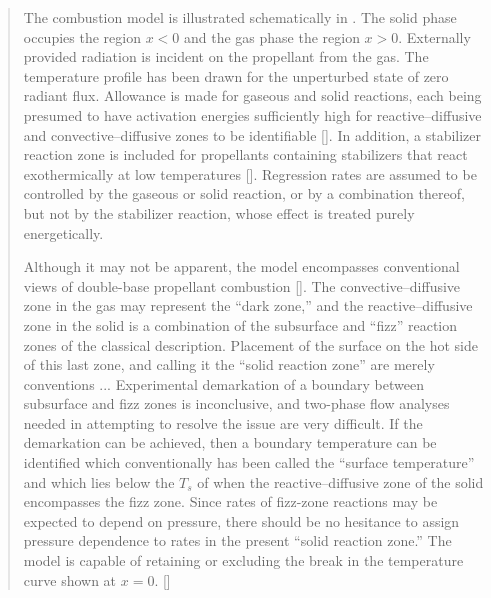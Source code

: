 \begin{quote}
The combustion model is illustrated schematically in . The solid phase occupies the region $x < 0$ and the gas phase the region $x > 0$. Externally provided radiation is incident on the propellant from the gas. The temperature profile has been drawn for the unperturbed state of zero radiant flux. Allowance is made for gaseous and solid reactions, each being presumed to have activation energies
sufficiently high for reactive--diffusive and convective--diffusive zones to be identifiable [\cite{Williams:1973}]. In addition, a stabilizer reaction zone is included for propellants containing stabilizers that react exothermically at low temperatures [\cite{Huggett:1960,Kovalskii:1967}]. Regression rates are assumed to be controlled by the gaseous or solid reaction, or by a combination thereof, but not by the stabilizer reaction, whose effect is treated purely energetically.

Although it may not be apparent, the model encompasses conventional views of double-base propellant combustion [\cite{Huggett:1960}]. The convective--diffusive zone in the gas may represent the ``dark zone,'' and the reactive--diffusive zone in the solid is a combination of the subsurface and ``fizz'' reaction zones of the classical description. Placement of the surface on the hot side of this last zone, and calling it the ``solid reaction zone'' are merely conventions ... Experimental demarkation of a boundary between subsurface and fizz zones is inconclusive, and two-phase flow analyses needed in attempting to resolve the issue are very difficult. If the demarkation can be achieved, then a boundary temperature can be identified which conventionally has been called the ``surface temperature'' and which lies below the $T_s$ of  when the reactive--diffusive zone of the solid encompasses the fizz zone. Since rates of fizz-zone reactions may be expected to depend on pressure, there should be no hesitance to assign pressure dependence to rates in the present ``solid reaction zone.'' The model is capable of retaining or excluding the break in the temperature curve shown at $x=0$.  [\cite{Ibiricu:1975}]
\end{quote}